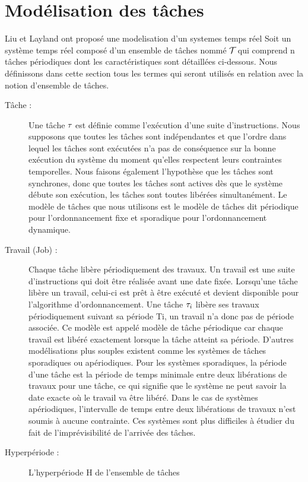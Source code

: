 \section{Modélisation des tâches}
Liu et Layland \cite{LL73} ont proposé une modelisation d'un systemes
temps réel Soit un système temps réel composé d’un ensemble de tâches
nommé $\mathcal{T}_{}$ qui comprend n tâches périodiques dont les
caractéristiques sont détaillées ci-dessous. Nous définissons dans
cette section tous les termes qui seront utilisés en relation avec la
notion d’ensemble de tâches.
\begin{description}
\item[Tâche :] Une tâche $\tau_{}$ est définie comme l’exécution
  d’une suite d’instructions. Nous supposons que toutes les tâches
  sont indépendantes et que l’ordre dans lequel les tâches sont
  exécutées n’a pas de conséquence sur la bonne exécution du système
  du moment qu’elles respectent leurs contraintes temporelles. Nous
  faisons également l’hypothèse que les tâches sont synchrones, donc
  que toutes les tâches sont actives dès que le système débute son
  exécution, les tâches sont toutes libérées simultanément. Le modèle
  de tâches que nous utilisons est le modèle de tâches dit périodique
  pour l’ordonnancement fixe et sporadique pour l’ordonnancement
  dynamique.
\item[Travail (Job) :] Chaque tâche libère périodiquement des
  travaux. Un travail est une suite d’instructions qui doit être
  réalisée avant une date fixée. Lorsqu’une tâche libère un travail,
  celui-ci est prêt à être exécuté et devient disponible pour
  l’algorithme d’ordonnancement. Une tâche $\tau_{i}$ libère ses travaux
  périodiquement suivant sa période Ti, un travail n’a donc pas de
  période associée. Ce modèle est appelé modèle de tâche périodique
  car chaque travail est libéré exactement lorsque la tâche atteint sa
  période. D’autres modélisations plus souples existent comme les
  systèmes de tâches sporadiques ou apériodiques. Pour les systèmes
  sporadiques, la période d’une tâche est la période de temps minimale
  entre deux libérations de travaux pour une tâche, ce qui signifie
  que le système ne peut savoir la date exacte où le travail va être
  libéré. Dans le cas de systèmes apériodiques, l’intervalle de temps
  entre deux libérations de travaux n’est soumis à aucune
  contrainte. Ces systèmes sont plus difficiles à étudier du fait de
  l’imprévisibilité de l’arrivée des tâches.
\item[Hyperpériode :] L’hyperpériode H de l’ensemble de tâches

\end{description}
